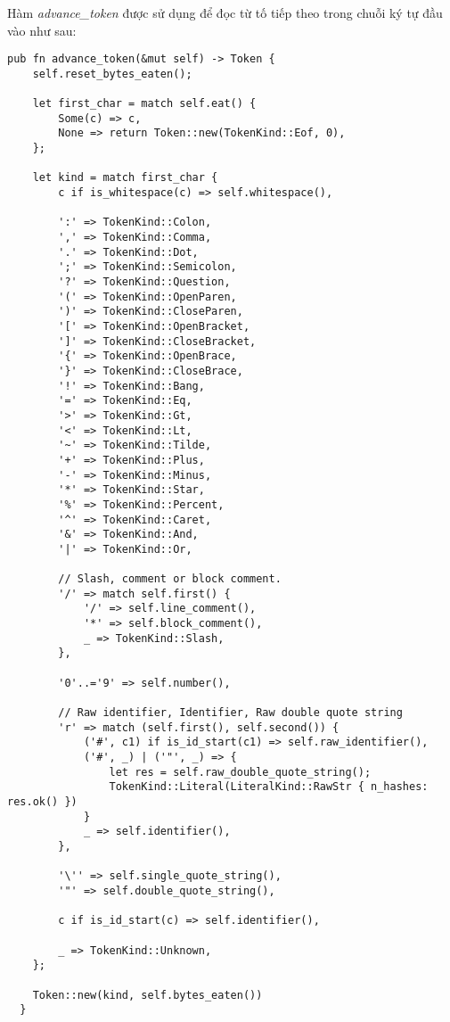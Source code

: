Hàm \textit{advance\_token} được sử dụng để đọc từ tố tiếp theo trong chuỗi ký tự đầu vào như sau:
\begin{lstlisting}[]
  pub fn advance_token(&mut self) -> Token {
    self.reset_bytes_eaten();

    let first_char = match self.eat() {
        Some(c) => c,
        None => return Token::new(TokenKind::Eof, 0),
    };

    let kind = match first_char {
        c if is_whitespace(c) => self.whitespace(),

        ':' => TokenKind::Colon,
        ',' => TokenKind::Comma,
        '.' => TokenKind::Dot,
        ';' => TokenKind::Semicolon,
        '?' => TokenKind::Question,
        '(' => TokenKind::OpenParen,
        ')' => TokenKind::CloseParen,
        '[' => TokenKind::OpenBracket,
        ']' => TokenKind::CloseBracket,
        '{' => TokenKind::OpenBrace,
        '}' => TokenKind::CloseBrace,
        '!' => TokenKind::Bang,
        '=' => TokenKind::Eq,
        '>' => TokenKind::Gt,
        '<' => TokenKind::Lt,
        '~' => TokenKind::Tilde,
        '+' => TokenKind::Plus,
        '-' => TokenKind::Minus,
        '*' => TokenKind::Star,
        '%' => TokenKind::Percent,
        '^' => TokenKind::Caret,
        '&' => TokenKind::And,
        '|' => TokenKind::Or,

        // Slash, comment or block comment.
        '/' => match self.first() {
            '/' => self.line_comment(),
            '*' => self.block_comment(),
            _ => TokenKind::Slash,
        },

        '0'..='9' => self.number(),

        // Raw identifier, Identifier, Raw double quote string
        'r' => match (self.first(), self.second()) {
            ('#', c1) if is_id_start(c1) => self.raw_identifier(),
            ('#', _) | ('"', _) => {
                let res = self.raw_double_quote_string();
                TokenKind::Literal(LiteralKind::RawStr { n_hashes: res.ok() })
            }
            _ => self.identifier(),
        },

        '\'' => self.single_quote_string(),
        '"' => self.double_quote_string(),

        c if is_id_start(c) => self.identifier(),

        _ => TokenKind::Unknown,
    };

    Token::new(kind, self.bytes_eaten())
  } 
\end{lstlisting}

